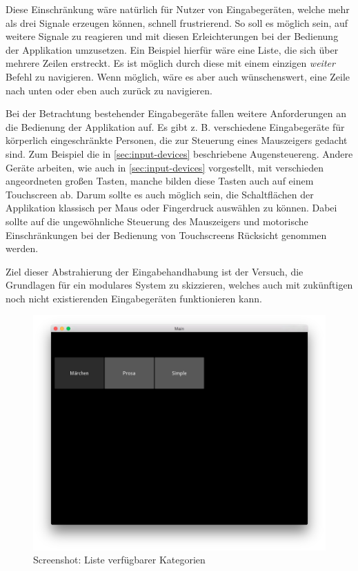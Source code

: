         Diese Einschränkung wäre natürlich für Nutzer von Eingabegeräten, welche mehr als drei Signale erzeugen können, schnell frustrierend. So soll es möglich sein, auf weitere Signale zu reagieren und mit diesen Erleichterungen bei der Bedienung der Applikation umzusetzen. Ein Beispiel hierfür wäre eine Liste, die sich über mehrere Zeilen erstreckt. Es ist möglich durch diese mit einem einzigen \emph{weiter} Befehl zu navigieren. Wenn möglich, wäre es aber auch wünschenswert, eine Zeile nach unten oder eben auch zurück zu navigieren.
        
        Bei der Betrachtung bestehender Eingabegeräte fallen weitere Anforderungen an die Bedienung der Applikation auf. Es gibt z. B. verschiedene Eingabegeräte für körperlich eingeschränkte Personen, die zur Steuerung eines Mauszeigers gedacht sind. Zum Beispiel die in \autoref{sec:input-devices} beschriebene Augensteuereng. Andere Geräte arbeiten, wie auch in \autoref{sec:input-devices} vorgestellt, mit verschieden angeordneten großen Tasten, manche bilden diese Tasten auch auf einem Touchscreen ab. Darum sollte es auch möglich sein, die Schaltflächen der Applikation klassisch per Maus oder Fingerdruck auswählen zu können. Dabei sollte auf die ungewöhnliche Steuerung des Mauszeigers und motorische Einschränkungen bei der Bedienung von Touchscreens Rücksicht genommen werden.
        
        Ziel dieser Abstrahierung der Eingabehandhabung ist der Versuch, die Grundlagen für ein modulares System zu skizzieren, welches auch mit zukünftigen noch nicht existierenden Eingabegeräten funktionieren kann.
        
        \begin{figure}[H]
    		\centering
    		\includegraphics[width=.6\linewidth]{images/kategorien.png}
    		\caption[Aufbau der Grafischen Benutzeroberfläche]{Screenshot: Liste verfügbarer Kategorien}
    		\label{img:categories}
		\end{figure}
        
